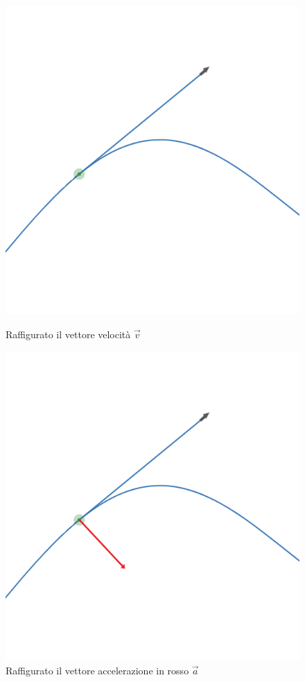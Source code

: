 \begin{figure}[H]
\centering
\begin{minipage}[c]{0.45\textwidth}
\centering
\includegraphics[width=1\textwidth]{image/derivata3}
\caption{Raffigurato il vettore velocità $\vec{v}$}
\label{img:derivata}
\end{minipage}%
\hspace{10mm}%
\begin{minipage}[c]{0.45\textwidth}
\centering
\includegraphics[width=1\textwidth]{image/accelerazione}
\caption{Raffigurato il vettore accelerazione in rosso $\vec{a}$}
\label{img:accelerazione}
\end{minipage}
\end{figure}


